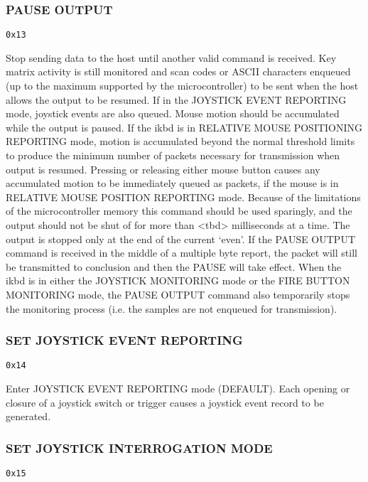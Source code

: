 \documentclass[a4paper,8pt,english]{sphinxmanual}
\begin{document}
\subsubsection{PAUSE OUTPUT}
\label{input/devices/atarikbd:pause-output}
\begin{Verbatim}[commandchars=\\\{\}]
0x13
\end{Verbatim}

Stop sending data to the host until another valid command is received. Key
matrix activity is still monitored and scan codes or ASCII characters enqueued
(up to the maximum supported by the microcontroller) to be sent when the host
allows the output to be resumed. If in the JOYSTICK EVENT REPORTING mode,
joystick events are also queued.
Mouse motion should be accumulated while the output is paused. If the ikbd is
in RELATIVE MOUSE POSITIONING REPORTING mode, motion is accumulated beyond the
normal threshold limits to produce the minimum number of packets necessary for
transmission when output is resumed. Pressing or releasing either mouse button
causes any accumulated motion to be immediately queued as packets, if the
mouse is in RELATIVE MOUSE POSITION REPORTING mode.
Because of the limitations of the microcontroller memory this command should
be used sparingly, and the output should not be shut of for more than \textless{}tbd\textgreater{}
milliseconds at a time.
The output is stopped only at the end of the current `even'. If the PAUSE
OUTPUT command is received in the middle of a multiple byte report, the packet
will still be transmitted to conclusion and then the PAUSE will take effect.
When the ikbd is in either the JOYSTICK MONITORING mode or the FIRE BUTTON
MONITORING mode, the PAUSE OUTPUT command also temporarily stops the
monitoring process (i.e. the samples are not enqueued for transmission).


\subsubsection{SET JOYSTICK EVENT REPORTING}
\label{input/devices/atarikbd:set-joystick-event-reporting}
\begin{Verbatim}[commandchars=\\\{\}]
0x14
\end{Verbatim}

Enter JOYSTICK EVENT REPORTING mode (DEFAULT). Each opening or closure of a
joystick switch or trigger causes a joystick event record to be generated.


\subsubsection{SET JOYSTICK INTERROGATION MODE}
\label{input/devices/atarikbd:set-joystick-interrogation-mode}
\begin{Verbatim}[commandchars=\\\{\}]
0x15
\end{Verbatim}
\end{document}

